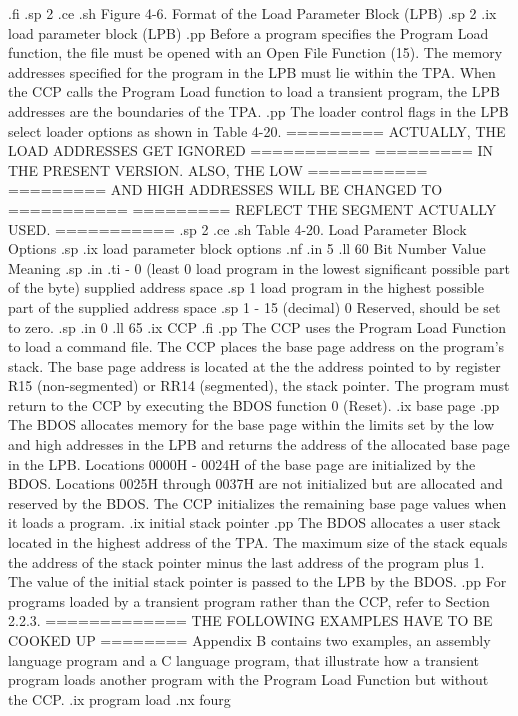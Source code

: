 .fi
.sp 2
.ce
.sh
Figure 4-6. Format of the Load Parameter Block (LPB) 
.sp 2
.ix load parameter block (LPB)
.pp
Before a program specifies the Program Load function, the file
must be opened with an Open File Function (15).
The memory addresses specified for the program in the LPB must
lie within the TPA. When the CCP calls the Program
Load function to load a transient program, the LPB 
addresses are the boundaries of the TPA. 
.pp
The loader control flags in the LPB select loader options as shown
in Table 4-20.
 ========= ACTUALLY, THE LOAD ADDRESSES GET IGNORED ===========
 ========= IN THE PRESENT VERSION.  ALSO, THE LOW   ===========
 ========= AND HIGH ADDRESSES WILL BE CHANGED TO    ===========
 ========= REFLECT THE SEGMENT ACTUALLY USED.       ===========
.sp 2
.ce
.sh 
Table 4-20.   Load Parameter Block Options
.sp
.ix load parameter block options
.nf
.in 5
.ll 60
   Bit Number    Value               Meaning
.sp 
.in
.ti -
0 (least           0       load  program in  the lowest
   significant             possible    part   of    the 
   byte)                   supplied address space
.sp
                   1       load program  in the highest
                           possible    part   of    the 
                           supplied address space
.sp
1 - 15 (decimal)   0       Reserved, should  be  set to 
                           zero.
.sp
.in 0
.ll 65
.ix CCP
.fi
.pp
The CCP uses the Program Load Function to load a command file.
The CCP places the base page address on the
program's stack. The base page address is located at the
the address pointed to by register R15 (non-segmented) or 
RR14 (segmented), the stack pointer.  The program must return
to the CCP by executing the BDOS function 0 (Reset).
.ix base page
.pp
The BDOS allocates memory for the base page within the limits set
by the low and high addresses in the LPB and returns the address
of the allocated base page in the LPB.  Locations 0000H - 0024H
of the base page are initialized by the BDOS. Locations 0025H
through 0037H are not initialized but are allocated and reserved
by the BDOS.  The CCP initializes the remaining base page values
when it loads a program. 
.ix initial stack pointer
.pp
The BDOS allocates a user stack located in the highest address of the TPA.
The maximum size of the stack equals the address of the stack pointer minus
the last address of the program plus 1. The value of the initial
stack pointer is passed to the LPB by the BDOS. 
.pp
For programs loaded by a transient program rather than 
the CCP, refer to Section 2.2.3.
============= THE FOLLOWING EXAMPLES HAVE TO BE COOKED UP ========
Appendix B contains two examples, an assembly language  program 
and a C language program, that illustrate how a transient program 
loads another program with the Program Load Function but without the CCP.
.ix program load
.nx fourg
